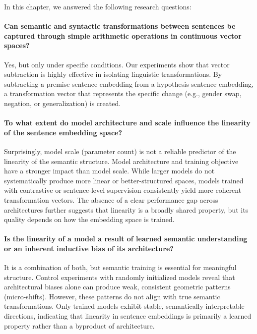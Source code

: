 \begin{mdframed}[
    linecolor=gray,
    linewidth=2pt,
    roundcorner=5,
    backgroundcolor=gray!5
]
\noindent
In this chapter, we answered the following research questions:

\paragraph{Can semantic and syntactic transformations between sentences be captured through simple arithmetic operations in continuous vector spaces?}
Yes, but only under specific conditions. Our experiments show that vector subtraction is highly effective in isolating linguistic transformations. By subtracting a premise sentence embedding from a hypothesis sentence embedding, a transformation vector that represents the specific change (e.g., gender swap, negation, or generalization) is created.


\paragraph{To what extent do model architecture and scale influence the linearity of the sentence embedding space?}
Surprisingly, model scale (parameter count) is not a reliable predictor of the linearity of the semantic structure. Model architecture and training objective have a stronger impact than model scale. While larger models do not systematically produce more linear or better-structured spaces, models trained with contrastive or sentence-level supervision consistently yield more coherent transformation vectors. The absence of a clear performance gap across architectures further suggests that linearity is a broadly shared property, but its quality depends on how the embedding space is trained.
    
\paragraph{Is the linearity of a model a result of learned semantic understanding or an inherent inductive bias of its architecture?}
It is a combination of both, but semantic training is essential for meaningful structure. Control experiments with randomly initialized models reveal that architectural biases alone can produce weak, consistent geometric patterns (micro-shifts). However, these patterns do not align with true semantic transformations. Only trained models exhibit stable, semantically interpretable directions, indicating that linearity in sentence embeddings is primarily a learned property rather than a byproduct of architecture.


\end{mdframed}

